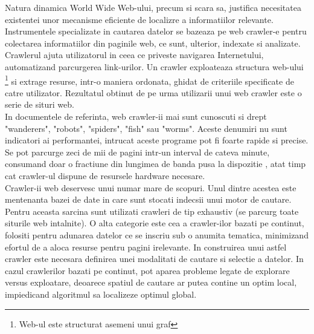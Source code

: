 Natura dinamica World Wide Web-ului, precum si scara sa, justifica necesitatea existentei unor mecanisme eficiente de localizre a informatiilor relevante. Instrumentele specializate in cautarea datelor se bazeaza pe web crawler-e pentru colectarea informatiilor din paginile web, ce sunt, ulterior, indexate si analizate.
\\ 

Crawlerul ajuta utilizatorul in ceea ce priveste navigarea Internetului, automatizand parcurgerea link-urilor. Un crawler exploateaza structura web-ului \footnote{Web-ul este structurat asemeni unui graf} si extrage resurse, intr-o maniera ordonata, ghidat de criteriile specificate de catre utilizator. Rezultatul obtinut de pe urma utilizarii unui web crawler este o serie de situri web.
\\

In documentele de referinta, web crawler-ii mai sunt cunoscuti si drept "wanderers",  "robots", "spiders", "fish" sau "worms". Aceste denumiri nu sunt indicatori ai performantei, intrucat aceste programe pot fi foarte rapide si precise. Se pot parcurge zeci de mii de pagini intr-un interval de cateva minute, consumand doar o fractiune din lungimea de banda pusa la dispozitie \cite{GautamPadminiFilippo}, atat timp cat crawler-ul dispune de resursele hardware necesare.
\\ 

Crawler-ii web deservesc unui numar mare de scopuri. Unul dintre acestea este mentenanta bazei de date in care sunt stocati indecsii unui motor de cautare. Pentru aceasta sarcina sunt utilizati crawleri de tip exhaustiv (se parcurg toate siturile web intalnite). O alta categorie este cea a crawler-ilor bazati pe continut, folositi pentru adunarea datelor ce se inscriu sub o anumita tematica, minimizand efortul de a aloca resurse pentru pagini irelevante. In construirea unui astfel crawler este necesara definirea unei modalitati de cautare si selectie a datelor. In cazul crawlerilor bazati pe continut, pot aparea probleme legate de explorare versus exploatare, deoarece spatiul de cautare ar putea contine un optim local, impiedicand algoritmul sa localizeze optimul global.\cite{PantSrinivasanMenczer} 
\\